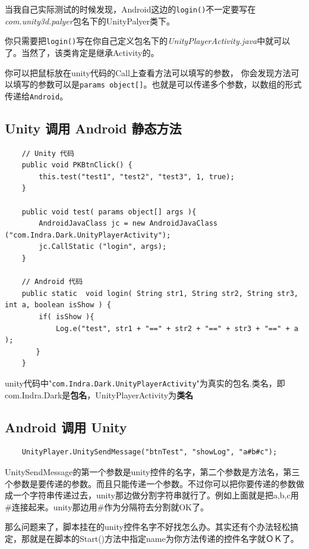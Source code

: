 \documentclass[UTF8,a4paper,12pt]{ctexbook}
\begin{document}
			当我自己实际测试的时候发现，Android这边的\verb|login()|不一定要写在\textit{com.unity3d.palyer}包名下的UnityPalyer类下。
			
			你只需要把\verb|login()|写在你自己定义包名下的\textit{UnityPlayerActivity.java}中就可以了。当然了，该类肯定是继承Activity的。
			
			你可以把鼠标放在unity代码的Call上查看方法可以填写的参数， 你会发现方法可以填写的参数可以是\verb|params object[]|。也就是可以传递多个参数，以数组的形式传递给\verb|Android|。
		
		\subsection{Unity 调用 Android 静态方法}
			\begin{lstlisting}
	// Unity 代码
	public void PKBtnClick() {
	    this.test("test1", "test2", "test3", 1, true);
	}
	
	public void test( params object[] args ){
	    AndroidJavaClass jc = new AndroidJavaClass ("com.Indra.Dark.UnityPlayerActivity");
	    jc.CallStatic ("login", args);
	}
	
	// Android 代码
	public static  void login( String str1, String str2, String str3, int a, boolean isShow ) {
	    if( isShow ){            
	        Log.e("test", str1 + "==" + str2 + "==" + str3 + "==" + a );
	　　}
	}
			\end{lstlisting}
			
			unity代码中"\verb|com.Indra.Dark.UnityPlayerActivity|"为真实的包名.类名，即com.Indra.Dark是\textbf{包名}，UnityPlayerActivity为\textbf{类名}
				
		\subsection{Android 调用 Unity}
			\begin{lstlisting}
	UnityPlayer.UnitySendMessage("btnTest", "showLog", "a#b#c");
			\end{lstlisting}
			
			UnitySendMessage的第一个参数是unity控件的名字，第二个参数是方法名，第三个参数是要传递的参数。而且只能传递一个参数。不过你可以把你要传递的参数做成一个字符串传递过去，unity那边做分割字符串就行了。例如上面就是把a,b,c用\#连接起来。unity那边用\#作为分隔符去分割就OK了。
		
			那么问题来了，脚本挂在的unity控件名字不好找怎么办。其实还有个办法轻松搞定，那就是在脚本的Start()方法中指定name为你方法传递的控件名字就ＯＫ了。
			
\end{document}
